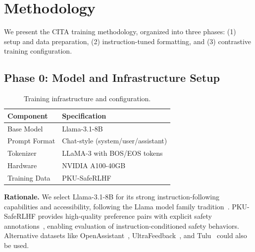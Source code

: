 
\vspace{-2mm}
\section{Methodology}
\label{sec:methodology}

We present the CITA training methodology, organized into three phases: (1) setup and data preparation, (2) instruction-tuned formatting, and (3) contrastive training configuration.

\vspace{-2mm}
\subsection{Phase 0: Model and Infrastructure Setup}
\label{sec:phase0}

\begin{table}[H]
\centering
\small
\begin{tabular}{@{}ll@{}}
\toprule
\textbf{Component} & \textbf{Specification} \\
\midrule
Base Model & Llama-3.1-8B~\cite{dubey2024llama} \\
Prompt Format & Chat-style (system/user/assistant) \\
Tokenizer & LLaMA-3 with BOS/EOS tokens \\
Hardware & NVIDIA A100-40GB \\
Training Data & PKU-SafeRLHF~\cite{ji2024pku} \\
\bottomrule
\end{tabular}
\caption{Training infrastructure and configuration.}
\label{tab:infrastructure}
\vspace{-4mm}
\end{table}

\textbf{Rationale.} We select Llama-3.1-8B for its strong instruction-following capabilities and accessibility, following the Llama model family tradition~\cite{touvron2023llama,touvron2023llama1,dubey2024llama3}. PKU-SafeRLHF provides high-quality preference pairs with explicit safety annotations~\cite{bai2022training}, enabling evaluation of instruction-conditioned safety behaviors. Alternative datasets like OpenAssistant~\cite{kopf2023openassistant}, UltraFeedback~\cite{cui2023ultrafeedback}, and Tulu~\cite{ivison2023camels} could also be used.

